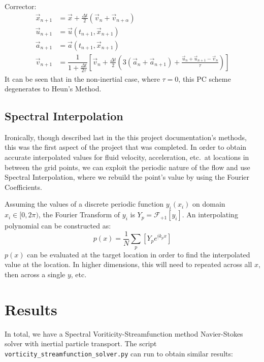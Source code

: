 \documentclass[12pt, reqno]{amsart}
\begin{document}
Corrector:
\begin{align}
    \vec{x}_{n + 1} &= \vec{x} + \frac{\Delta t}{2} \left( \vec{v}_n + \vec{v}_{n + \alpha} \right) \\
    \vec{u}_{n+1} &= \vec{u} ( t_{n+1}, \vec{x}_{n+1})\\
    \vec{a}_{n+1} &= \vec{a} (t_{n+1}, \vec{x}_{n+1})\\
    \vec{v}_{n+1} &= \dfrac{1}{1 + \frac{\Delta t}{2 \tau}} \left[ \vec{v}_n + \frac{\Delta t}{2} \left( 3 (\vec{a}_n + \vec{a}_{n+1} ) + \frac{\vec{u}_n + \vec{u}_{n+1} - \vec{v}_n}{\tau} \right) \right]
\end{align}
It can be seen that in the non-inertial case, where $\tau = 0$, this PC scheme degenerates to Heun's Method.

\subsection{Spectral Interpolation}
Ironically, though described last in the this project documentation's methods, this was the first aspect of the project that was completed. In order to obtain accurate interpolated values for fluid velocity, acceleration, etc.\ at locations in between the grid points, we can exploit the periodic nature of the flow and use Spectral Interpolation, where we rebuild the point's value by using the Fourier Coefficients.

Assuming the values of a discrete periodic function $y_i(x_i)$ on domain $x_i \in [0, 2 \pi)$, the Fourier Transform of $y_i$ is $Y_p = \mathcal{F}_{+1} \left[ y_i \right]$. An interpolating polynomial can be constructed as:
\begin{equation}
    p(x) = \frac{1}{N} \sum_p \left[ Y_p e^{\underline{i} k_p x} \right]
\end{equation}
$p(x)$ can be evaluated at the target location in order to find the interpolated value at the location. In higher dimensions, this will need to repeated across all $x$, then across a single $y$, etc.

\section{Results}
In total, we have a Spectral Voriticity-Streamfunction method Navier-Stokes solver with inertial particle transport. The script \texttt{vorticity\_streamfunction\_solver.py} can run to obtain similar results:
\end{document}
